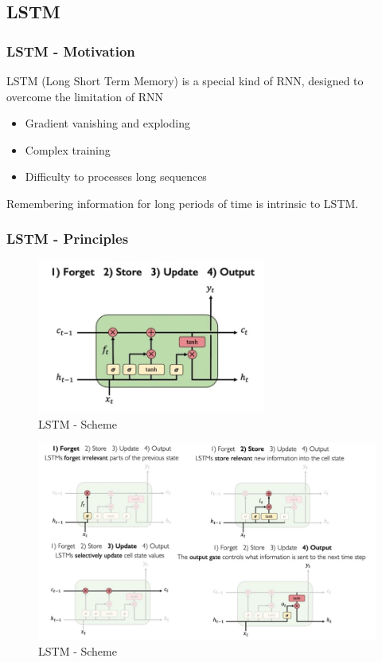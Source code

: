 \documentclass[12pt]{report}
\begin{document}
\newpage
\subsection{LSTM}


\subsubsection{LSTM - Motivation}

LSTM (Long Short Term Memory) is a special kind of RNN,  designed to overcome the limitation of RNN
\begin{itemize}
	\item Gradient vanishing and exploding
	\item Complex training
	\item Difficulty to processes long sequences 
\end{itemize}

Remembering information for long periods of time is intrinsic to LSTM.

\subsubsection{LSTM - Principles}


\begin{figure}[H]\centering\includegraphics[width=7.5cm]{LSTM_MAIN.jpeg}\caption{LSTM - Scheme}\end{figure}

\begin{figure}[H]\centering\includegraphics[width=14cm]{LSTM_SCHEME.jpeg}\caption{LSTM - Scheme}\end{figure}
\end{document}
